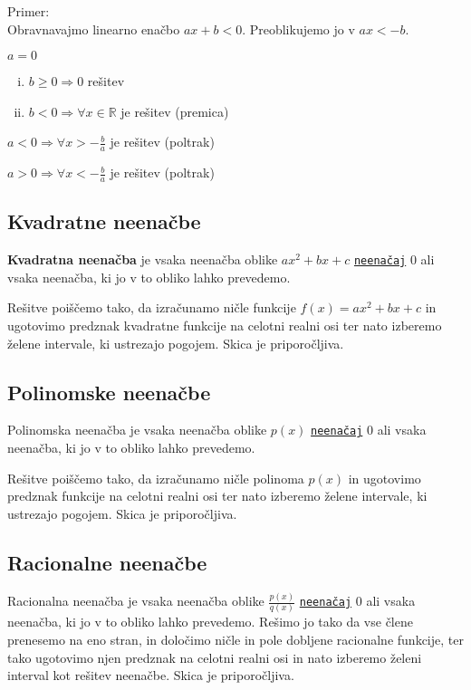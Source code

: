 \documentclass[a4paper,oneside,12pt,fleqn]{article}
\def\R{\ensuremath{\mathbb R}}
\renewcommand\implies\Rightarrow
\numberwithin{equation}{section}
\newenvironment{enumerate*}%
{
\vspace{-12pt}%
\begin{enumerate}%
\setlength{\itemsep}{0pt}%
\setlength{\parskip}{2pt}}%
{\end{enumerate}}
\begin{document}
Primer:\\
Obravnavajmo linearno enačbo $ax+b<0$.
Preoblikujemo jo v $ax<-b$.
\begin{enumerate*}
  \item $a = 0$
    \begin{enumerate}[i.]
      \item $b \ge 0 \implies 0$ rešitev
      \item $b < 0 \implies \forall x \in \R$ je rešitev (premica)
    \end{enumerate}
  \item $a < 0 \implies \forall x > -\frac{b}{a}$ je rešitev (poltrak)
  \item $a > 0 \implies \forall x < -\frac{b}{a}$ je rešitev (poltrak)
\end{enumerate*}

\subsection{Kvadratne neenačbe}
\label{sec:neenac:kvad}
\textbf{Kvadratna neenačba} je vsaka neenačba oblike $ax^2 + bx + c$
\hyperlink{point:neenacaj}{\texttt{neenačaj}} $0$
ali vsaka neenačba, ki jo v to obliko lahko prevedemo.

Rešitve poiščemo tako, da izračunamo ničle funkcije $f(x)
= ax^2 + bx + c$ in ugotovimo predznak kvadratne funkcije na celotni realni osi ter nato 
izberemo želene intervale, ki ustrezajo pogojem. Skica je priporočljiva.

\subsection{Polinomske neenačbe}
\label{sec:neenac:pol}
Polinomska neenačba je vsaka neenačba oblike $p(x)$
\hyperlink{point:neenacaj}{\texttt{neenačaj}} $0$ ali vsaka
neenačba, ki jo v to obliko lahko prevedemo.

Rešitve poiščemo tako, da izračunamo ničle polinoma $p(x)$
in ugotovimo predznak funkcije na celotni realni osi ter nato 
izberemo želene intervale, ki ustrezajo pogojem. Skica je priporočljiva.

\subsection{Racionalne neenačbe}
\label{sec:neenac:rac}
Racionalna neenačba je vsaka neenačba oblike $\frac{p(x)}{q(x)}$
\hyperlink{point:neenacaj}{\texttt{neenačaj}} $0$ ali
vsaka neenačba, ki jo v to obliko lahko prevedemo. Rešimo jo
tako da vse člene prenesemo na eno stran, in določimo ničle in pole dobljene racionalne
funkcije, ter tako ugotovimo njen predznak na celotni realni
osi in nato izberemo želeni interval kot rešitev neenačbe. Skica je priporočljiva.
\end{document}
